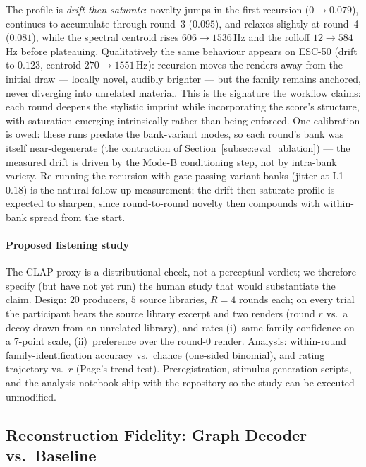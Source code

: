 \documentclass[12pt,a4paper]{article}
\begin{document}
The profile is \emph{drift-then-saturate}: novelty jumps in the first
recursion ($0 \to 0.079$), continues to accumulate through round~3
($0.095$), and relaxes slightly at round~4 ($0.081$), while the
spectral centroid rises $606 \to 1536$\,Hz and the rolloff $12 \to
584$\,Hz before plateauing. Qualitatively the same behaviour appears on
ESC-50 (drift to $0.123$, centroid $270 \to 1551$\,Hz): recursion moves
the renders away from the initial draw — locally novel, audibly
brighter — but the family remains anchored, never diverging into
unrelated material. This is the signature the workflow claims: each
round deepens the stylistic imprint while incorporating the score's
structure, with saturation emerging intrinsically rather than being
enforced. One calibration is owed: these runs predate the bank-variant
modes, so each round's bank was itself near-degenerate (the contraction
of Section~\ref{subsec:eval_ablation}) — the measured drift is driven
by the Mode-B conditioning step, not by intra-bank variety. Re-running
the recursion with gate-passing variant banks (jitter at L1 $0.18$) is
the natural follow-up measurement; the drift-then-saturate profile is
expected to sharpen, since round-to-round novelty then compounds with
within-bank spread from the start.

\paragraph{Proposed listening study}
The CLAP-proxy is a distributional check, not a perceptual verdict; we
therefore specify (but have not yet run) the human study that would
substantiate the claim. Design: $20$ producers, $5$ source libraries,
$R{=}4$ rounds each; on every trial the participant hears the source
library excerpt and two renders (round $r$ vs.\ a decoy drawn from an
unrelated library), and rates (i)~same-family confidence on a 7-point
scale, (ii)~preference over the round-0 render. Analysis: within-round
family-identification accuracy vs.\ chance (one-sided binomial), and
rating trajectory vs.\ $r$ (Page's trend test). Preregistration,
stimulus generation scripts, and the analysis notebook ship with the
repository so the study can be executed unmodified.

\subsection{Reconstruction Fidelity: Graph Decoder vs.\ Baseline}
\label{subsec:eval_reconstruction}
\end{document}

